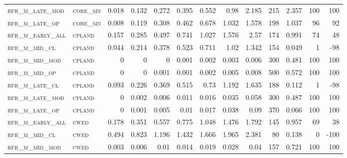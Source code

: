 \begin{landscape}
\begin{center}
\begin{footnotesize}
\begin{longtable}{llrrrrrrrr|rrr}
\textsc{rfr\_m\_late\_mod } & \textsc{core\_mn  }   & 0.018   & 0.132   & 0.272   & 0.395    & 0.552    & 0.98     & 2.185    & 215    & 2.357         & 100           & 100             \\
\textsc{rfr\_m\_late\_op  } & \textsc{core\_mn  }   & 0.008   & 0.119   & 0.308   & 0.462    & 0.678    & 1.032    & 1.578    & 198    & 1.037         & 96            & 92              \\
\textsc{rfr\_m\_early\_all} & \textsc{cpland    }   & 0.157   & 0.285   & 0.497   & 0.741    & 1.027    & 1.576    & 2.57     & 174    & 0.991         & 74            & 48              \\
\textsc{rfr\_m\_mid\_cl   } & \textsc{cpland    }   & 0.044   & 0.214   & 0.378   & 0.523    & 0.711    & 1.02     & 1.342    & 154    & 0.049         & 1             & -98             \\
\textsc{rfr\_m\_mid\_mod  } & \textsc{cpland    }   & 0       & 0       & 0       & 0.001    & 0.002    & 0.003    & 0.006    & 300    & 0.481         & 100           & 100             \\
\textsc{rfr\_m\_mid\_op   } & \textsc{cpland    }   & 0       & 0       & 0.001   & 0.001    & 0.002    & 0.005    & 0.008    & 500    & 0.572         & 100           & 100             \\
\textsc{rfr\_m\_late\_cl  } & \textsc{cpland    }   & 0.093   & 0.226   & 0.369   & 0.515    & 0.73     & 1.192    & 1.635    & 188    & 0.112         & 1             & -98             \\
\textsc{rfr\_m\_late\_mod } & \textsc{cpland    }   & 0       & 0.002   & 0.006   & 0.011    & 0.016    & 0.035    & 0.058    & 300    & 0.487         & 100           & 100             \\
\textsc{rfr\_m\_late\_op  } & \textsc{cpland    }   & 0       & 0.001   & 0.005   & 0.01     & 0.017    & 0.038    & 0.09     & 370    & 0.066         & 100           & 100             \\
\textsc{rfr\_m\_early\_all} & \textsc{cwed      }   & 0.178   & 0.351   & 0.557   & 0.775    & 1.048    & 1.476    & 1.792    & 145    & 0.957         & 69            & 38              \\
\textsc{rfr\_m\_mid\_cl   } & \textsc{cwed      }   & 0.494   & 0.823   & 1.196   & 1.432    & 1.666    & 1.965    & 2.381    & 80     & 0.138         & 0             & -100            \\
\textsc{rfr\_m\_mid\_mod  } & \textsc{cwed      }   & 0.003   & 0.006   & 0.01    & 0.014    & 0.019    & 0.028    & 0.04     & 157    & 0.721         & 100           & 100             \\

\end{longtable}
\end{footnotesize}
\end{center}
\end{landscape}
